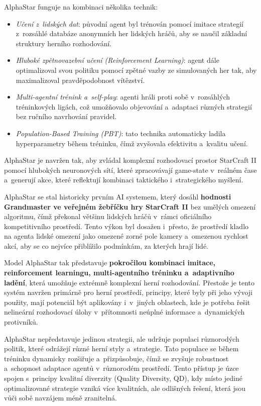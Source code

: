 AlphaStar funguje na kombinaci několika technik:
\begin{itemize}
    \item \textit{Učení z~lidských dat}: původní agent byl trénován pomocí imitace strategií z~rozsáhlé databáze anonymních her lidských hráčů, aby se naučil základní struktury herního rozhodování.
    \item \textit{Hluboké zpětnovazební učení (Reinforcement Learning)}: agent dále optimalizoval svou politiku pomocí zpětné vazby ze simulovaných her tak, aby maximalizoval pravděpodobnost vítězství.
    \item \textit{Multi-agentní trénink a~self-play}: agenti hráli proti sobě v~rozsáhlých tréninkových ligách, což umožňovalo objevování a~adaptaci různých strategií bez ručního navrhování pravidel.
    \item \textit{Population-Based Training (PBT)}\cite{Jaderberg2017}: tato technika automaticky ladila hyperparametry během tréninku, čímž zvyšovala efektivitu a~kvalitu učení.
\end{itemize}

AlphaStar je navržen tak, aby zvládal komplexní rozhodovací prostor StarCraft II pomocí hlubokých neuronových sítí, které zpracovávají game-state v~reálném čase a~generují akce, které reflektují kombinaci taktického i~strategického myšlení.

AlphaStar se stal historicky prvním AI systemem, který dosáhl \textbf{hodnosti Grandmaster ve veřejném žebříčku hry StarCraft II} bez umělých omezení algoritmu, čímž překonal většinu lidských hráčů v~rámci oficiálního kompetitivního prostředí. Tento výkon byl dosažen i~přesto, že prostředí kladlo na agenta lidské omezení jako omezené zorné pole kamery a~omezenou rychlost akcí, aby se co nejvíce přiblížilo podmínkám, za kterých hrají lidé.

Model AlphaStar tak představuje \textbf{pokročilou kombinaci imitace, reinforcement learningu, multi-agentního tréninku a~adaptivního ladění}, která umožňuje extrémně komplexní herní rozhodování. Přestože je tento systém navržen primárně pro herní prostředí, principy, které byly při jeho vývoji použity, mají potenciál být aplikovány i~v~jiných oblastech, kde je potřeba řešit nelineární rozhodovací úlohy v~přítomnosti neúplné informace a~dynamických protivníků.

AlphaStar nepředstavuje jedinou strategii, ale udržuje populaci různorodých politik, které odrážejí různé herní styly a~strategie. Tato populace se během tréninku dynamicky rozšiřuje a~přizpůsobuje, čímž se zvyšuje robustnost a~schopnost adaptace agentů v~různorodém prostředí. Tento přístup je úzce spojen s~principy kvalitní diverzity (Quality Diversity, QD), kdy místo jediné optimalizované strategie vzniká více kvalitních, ale odlišných řešení, která jsou vůči sobě navzájem méně zranitelná.

